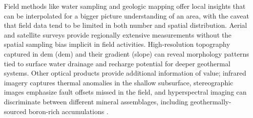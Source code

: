 Field methods like water sampling and geologic mapping offer local insights that can be interpolated for a bigger picture understanding of an area, with the caveat that field data tend to be limited in both number and spatial distribution. Aerial and satellite surveys provide regionally extensive measurements without the spatial sampling bias implicit in field activities. High-resolution topography captured in \acrlong{dem} (\acrshort{dem}) and their gradient (slope) can reveal morphology patterns tied to surface water drainage and recharge potential for deeper geothermal systems. Other optical products provide additional information of value; infrared imagery captures thermal anomalies in the shallow subsurface, stereographic images emphasize fault offsets missed in the field, and hyperspectral imaging can discriminate between different mineral assemblages, including geothermally-sourced boron-rich accumulations .

